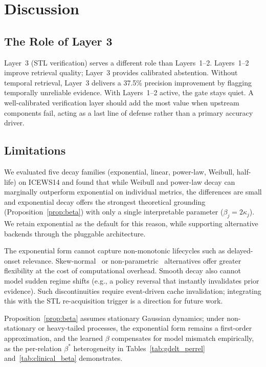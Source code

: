 \documentclass[conference]{IEEEtran}
\begin{document}
\section{Discussion}

\subsection{The Role of Layer 3}

Layer~3 (STL verification) serves a different role than Layers~1--2. Layers~1--2 improve retrieval quality; Layer~3 provides calibrated abstention. Without temporal retrieval, Layer~3 delivers a 37.5\% precision improvement by flagging temporally unreliable evidence. With Layers~1--2 active, the gate stays quiet. A well-calibrated verification layer should add the most value when upstream components fail, acting as a last line of defense rather than a primary accuracy driver.

\subsection{Limitations}

We evaluated five decay families (exponential, linear, power-law, Weibull, half-life) on ICEWS14 and found that while Weibull and power-law decay can marginally outperform exponential on individual metrics, the differences are small and exponential decay offers the strongest theoretical grounding (Proposition~\ref{prop:beta}) with only a single interpretable parameter ($\beta_j = 2\kappa_j$). We retain exponential as the default for this reason, while supporting alternative backends through the pluggable architecture.

The exponential form cannot capture non-monotonic lifecycles such as delayed-onset relevance. Skew-normal~\cite{chronocept2025} or non-parametric~\cite{sprite} alternatives offer greater flexibility at the cost of computational overhead. Smooth decay also cannot model sudden regime shifts (e.g., a policy reversal that instantly invalidates prior evidence). Such discontinuities require event-driven cache invalidation; integrating this with the STL re-acquisition trigger is a direction for future work.

Proposition~\ref{prop:beta} assumes stationary Gaussian dynamics; under non-stationary or heavy-tailed processes, the exponential form remains a first-order approximation, and the learned $\beta$ compensates for model mismatch empirically, as the per-relation $\beta^*$ heterogeneity in Tables~\ref{tab:gdelt_perrel} and~\ref{tab:clinical_beta} demonstrates.
\end{document}
